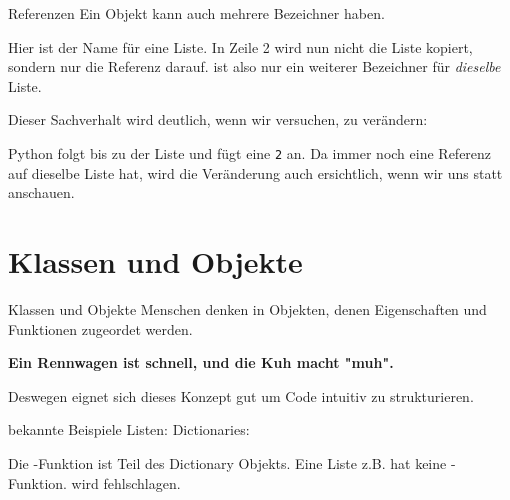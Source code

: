 \begin{frame}{Referenzen}
	Ein Objekt kann auch mehrere Bezeichner haben.
	
	Hier ist  der Name für eine Liste. In Zeile 2 wird nun nicht die Liste kopiert, sondern nur die Referenz darauf.  ist also nur ein weiterer Bezeichner für \textit{dieselbe} Liste.
	
	Dieser Sachverhalt wird deutlich, wenn wir versuchen,  zu verändern:
	
	Python folgt  bis zu der Liste und fügt eine \texttt{2} an. Da  immer noch eine Referenz auf dieselbe Liste hat, wird die Veränderung auch ersichtlich, wenn wir uns  statt  anschauen.
\end{frame}

\section{Klassen und Objekte}
\begin{frame}{Klassen und Objekte}
	Menschen denken in Objekten, denen Eigenschaften und Funktionen zugeordet werden. \linebreak
	\begin{center}
		 \textbf{Ein Rennwagen ist schnell, und die Kuh macht "muh".} \linebreak
	\end{center}
	Deswegen eignet sich dieses Konzept gut um Code intuitiv zu strukturieren.
\end{frame}
\begin{frame}{bekannte Beispiele}
	Listen: 
	\linebreak
	Dictionaries: 
	\linebreak
	
	Die -Funktion ist Teil des Dictionary Objekts. Eine Liste z.B. hat keine -Funktion. 
	\linebreak\linebreak
	 wird fehlschlagen.	
\end{frame}

